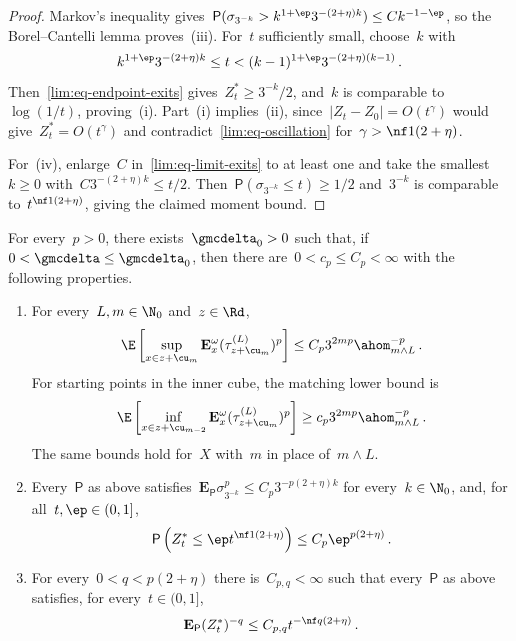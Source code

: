 \documentclass[11pt]{amsart}
\begin{document}
\begin{proof}
Markov's inequality gives~$\mathsf P(\sigma_{3^{-k}}>k^{1+\ep}3^{-(2+\eta)k})\leq Ck^{-1-\ep}$, so the Borel--Cantelli lemma proves~(iii). For~$t$ sufficiently small, choose~$k$ with
\begin{equation*}
	k^{1+\ep}3^{-(2+\eta)k}\leq t
	<(k-1)^{1+\ep}3^{-(2+\eta)(k-1)}\,.
\end{equation*}
Then~\eqref{lim:eq-endpoint-exits} gives~$Z_t^*\geq3^{-k}/2$, and~$k$ is comparable to~$\log(1/t)$, proving~(i). Part~(i) implies~(ii), since~$|Z_t-Z_0|=O(t^\gamma)$ would give~$Z_t^*=O(t^\gamma)$ and contradict~\eqref{lim:eq-oscillation} for~$\gamma>\nf1{(2+\eta)}$.

\smallskip

For~(iv), enlarge~$C$ in~\eqref{lim:eq-limit-exits} to at least one and take the smallest~$k\geq0$ with~$C3^{-(2+\eta)k}\leq t/2$. Then~$\mathsf P(\sigma_{3^{-k}}\leq t)\geq1/2$ and~$3^{-k}$ is comparable to~$t^{\nf1{(2+\eta)}}$, giving the claimed moment bound.
\end{proof}

\begin{corollary}
\label{lim:cor-exit-moments}
For every~$p>0$, there exists~$\gmcdelta_0>0$ such that, if~$0<\gmcdelta\leq\gmcdelta_0$, then there are~$0<c_p\leq C_p<\infty$ with the following properties.
\begin{enumerate}[label=(\roman*)]
\item For every~$L,m\in\N_0$ and~$z\in\Rd$,
\begin{equation}
	\E\left[\sup_{x\in z+\cu_m}\mathbf E_x^\omega
	(\tau_{z+\cu_m}^{(L)})^p\right]\leq C_p3^{2mp}\ahom_{m\wedge L}^{-p}\,.
	\label{lim:eq-exit-moments}
\end{equation}
For starting points in the inner cube, the matching lower bound is
\begin{equation*}
	\E\left[\inf_{x\in z+\cu_{m-2}}\mathbf E_x^\omega
	(\tau_{z+\cu_m}^{(L)})^p\right]\geq c_p3^{2mp}\ahom_{m\wedge L}^{-p}\,.
\end{equation*}
The same bounds hold for~$X$ with~$m$ in place of~$m\wedge L$.
\item Every~$\mathsf P$ as above satisfies~$\mathbf E_{\mathsf P}\sigma_{3^{-k}}^p\leq C_p3^{-p(2+\eta)k}$ for every~$k\in\N_0$, and, for all~$t,\ep\in(0,1]$,
\begin{equation*}
	\mathsf P\left(Z_t^*\leq\ep t^{\nf1{(2+\eta)}}\right)
	\leq C_p\ep^{p(2+\eta)}\,.
\end{equation*}
\item For every~$0<q<p(2+\eta)$ there is~$C_{p,q}<\infty$ such that every~$\mathsf P$ as above satisfies, for every~$t\in(0,1]$,
\begin{equation*}
	\mathbf E_{\mathsf P}(Z_t^*)^{-q}
	\leq C_{p,q}t^{-\nf q{(2+\eta)}}\,.
\end{equation*}
\end{enumerate}
\end{corollary}
\end{document}
